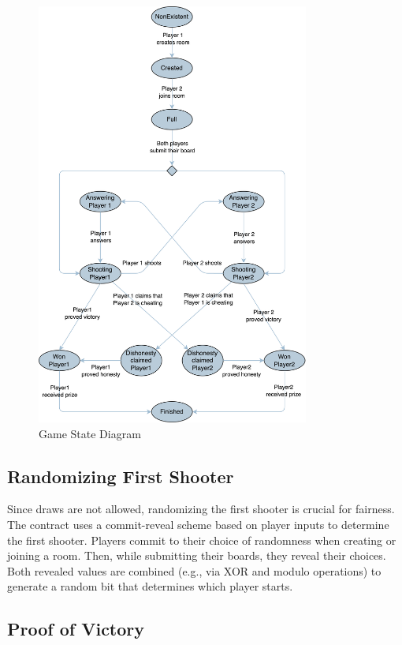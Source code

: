 \documentclass{article}
\begin{document}
    \begin{figure}[H]
        \centering
        \includegraphics[width=0.8\textwidth]{state.png}
        \caption{Game State Diagram}
        \label{fig:game_state}
    \end{figure}

    \subsection{Randomizing First Shooter}

    Since draws are not allowed, randomizing the first shooter is crucial for fairness. The contract uses a commit-reveal scheme based on player inputs to determine the first shooter. Players commit to their choice of randomness when creating or joining a room. Then, while submitting their boards, they reveal their choices. Both revealed values are combined (e.g., via XOR and modulo operations) to generate a random bit that determines which player starts.

    \subsection{Proof of Victory}
\end{document}
